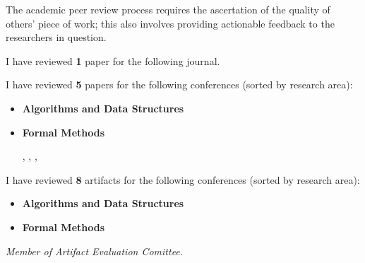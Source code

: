 
The academic peer review process requires the ascertation of the quality of others' piece of work;
this also involves providing actionable feedback to the researchers in question.

\medskip

I have reviewed {\bf 1} paper for the following journal.

\smallskip


\medskip

I have reviewed {\bf 5} papers for the following conferences (sorted by research area):

\smallskip

\begin{itemize}
\item[] {\bf Algorithms and Data Structures}

  \smallskip


  \medskip

\item[] {\bf Formal Methods}

  \smallskip

  , , , 

\end{itemize}

\medskip

I have reviewed {\bf 8} artifacts for the following conferences (sorted by research area):

\smallskip

\begin{itemize}
\item[] {\bf Algorithms and Data Structures}

  \smallskip


  \medskip

\item[] {\bf Formal Methods}

  \smallskip


\end{itemize}

\medskip

\textdagger\quad \emph{Member of Artifact Evaluation Comittee.} %
